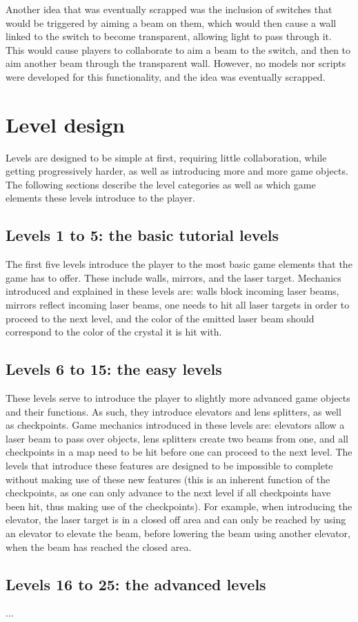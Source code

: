 			Another idea that was eventually scrapped was the inclusion of
			switches that would be triggered by aiming a beam on them, which
			would then cause a wall linked to the switch to become transparent,
			allowing light to pass through it. This would cause players to
			collaborate to aim a beam to the switch, and then to aim another
			beam through the transparent wall. However, no models nor scripts
			were developed for this functionality, and the idea was eventually
			scrapped.
			
	\section{Level design} \label{sec:leveldesign}
		Levels are designed to be simple at first, requiring little collaboration,
		while getting progressively harder, as well as introducing more and more
		game objects. The following sections describe the level categories as
		well as which game elements these levels introduce to the player.

		\subsection{Levels 1 to 5: the basic tutorial levels} \label{ssec:basiclevels}
			The first five levels introduce the player to the most basic game
			elements that the game has to offer. These include walls, mirrors,
			and the laser target. Mechanics introduced and explained in these
			levels are: walls block incoming laser beams, mirrors reflect
			incoming laser beams, one needs to hit all laser targets in order
			to proceed to the next level, and the color of the emitted laser
			beam should correspond to the color of the crystal it is hit with.
			
		\subsection{Levels 6 to 15: the easy levels} \label{ssec: easylevels}
			These levels serve to introduce the player to slightly more advanced
			game objects and their functions. As such, they introduce elevators
			and lens splitters, as well as checkpoints. Game mechanics introduced
			in these levels are: elevators allow a laser beam to pass over objects,
			lens splitters create two beams from one, and all checkpoints in a
			map need to be hit before one can proceed to the next level. The
			levels that introduce these features are designed to be impossible
			to complete without making use of these new features (this is an
			inherent function of the checkpoints, as one can only advance to the
			next level if all checkpoints have been hit, thus making use of
			the checkpoints). For example, when introducing the elevator, the
			laser target is in a closed off area and can only be reached by
			using an elevator to elevate the beam, before lowering the beam using
			another elevator, when the beam has reached the closed area.
			
		\subsection{Levels 16 to 25: the advanced levels}
			...